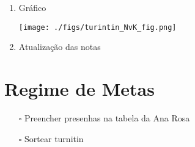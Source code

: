 \documentclass[11pt]{article}
\begin{document}
\begin{enumerate}
\item Gráfico
\label{sec:org9fec770}
\begin{center}
\texttt{[image: ./figs/turintin\_NvK\_fig.png]}
\end{center}



\item Atualização das notas
\label{sec:org47518ea}
\end{enumerate}

\section{Regime de Metas}
\label{sec:org70c24f3}

\begin{itemize}
\item[{$\square$}] Preencher presenhas na tabela da Ana Rosa
\item[{$\square$}] Sortear turnitin
\end{itemize}
\end{document}
